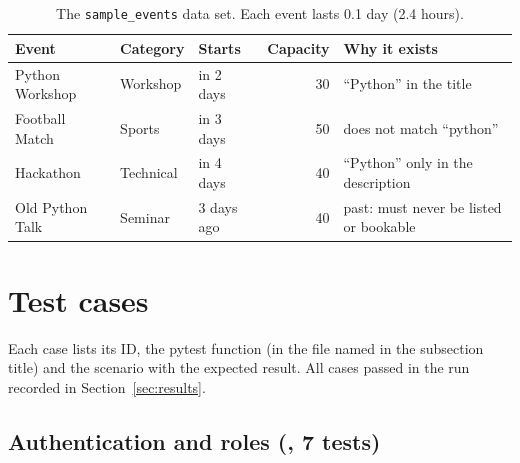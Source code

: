 \documentclass[11pt,a4paper]{article}
\begin{document}
\begin{table}[H]
\centering
\small
\begin{tabular}{@{}l l l r l@{}}
\toprule
\textbf{Event} & \textbf{Category} & \textbf{Starts} & \textbf{Capacity} & \textbf{Why it exists} \\
\midrule
Python Workshop  & Workshop  & in 2 days    & 30 & ``Python'' in the title \\
Football Match   & Sports    & in 3 days    & 50 & does not match ``python'' \\
Hackathon        & Technical & in 4 days    & 40 & ``Python'' only in the description \\
Old Python Talk  & Seminar   & 3 days ago   & 40 & past: must never be listed or bookable \\
\bottomrule
\end{tabular}
\caption{The \texttt{sample\_events} data set. Each event lasts 0.1 day (2.4 hours).}
\end{table}

\section{Test cases}

Each case lists its ID, the pytest function (in the file named in the subsection title) and the
scenario with the expected result. All cases passed in the run recorded in Section~\ref{sec:results}.

\subsection{Authentication and roles (\texorpdfstring{}{test\_auth.py}, 7 tests)}
\end{document}
